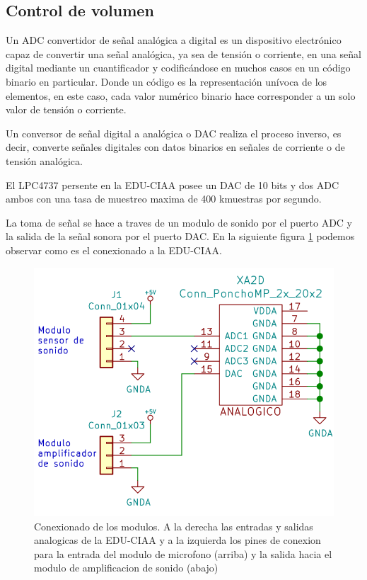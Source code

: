 \subsection{Control de volumen}
Un ADC convertidor de señal analógica a digital es un dispositivo electrónico capaz de convertir una señal analógica, ya sea de tensión o corriente, en una señal digital mediante un cuantificador y codificándose en muchos casos en un código binario en particular. Donde un código es la representación unívoca de los elementos, en este caso, cada valor numérico binario hace corresponder a un solo valor de tensión o corriente.

Un conversor de señal digital a analógica o DAC realiza el proceso inverso, es decir, converte señales digitales con datos binarios en señales de corriente o de tensión analógica.

El LPC4737 persente en la EDU-CIAA posee un DAC de 10 bits y dos ADC ambos con una tasa de muestreo maxima de 400 kmuestras por segundo.

La toma de señal se hace a traves de un modulo de sonido por el puerto ADC y la salida de la señal sonora por el puerto DAC. En la siguiente figura \ref{fig:controlVolumen} podemos observar  como es el conexionado a la EDU-CIAA.

\begin{figure}[h]
	\centering
	\includegraphics[scale=.3]{./Figures/controlVolumen.png}
	\caption{Conexionado de los modulos. A la derecha las entradas y salidas analogicas de la EDU-CIAA y a la izquierda los pines de conexion para la entrada del modulo de microfono (arriba) y la salida hacia el modulo de amplificacion de sonido (abajo)}
	\label{fig:controlVolumen}
\end{figure}

